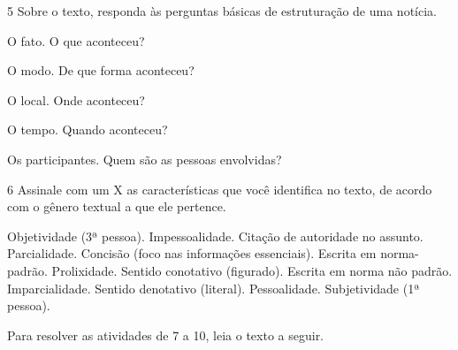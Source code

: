 \num{5} Sobre o texto, responda às perguntas básicas de estruturação de uma notícia.

\begin{escolha}
\item O fato. O que aconteceu? 


\item O modo. De que forma aconteceu? 


\item O local. Onde aconteceu? 


\item O tempo. Quando aconteceu? 


\item Os participantes. Quem são as pessoas envolvidas? 

\end{escolha}



\num{6} Assinale com um X as características que você identifica no
texto, de acordo com o gênero textual a que ele pertence.

\begin{boxlist}
 Objetividade (3ª pessoa). 
 Impessoalidade.
 Citação de autoridade no assunto. 
 Parcialidade. 
 Concisão (foco nas informações essenciais). 
 Escrita em norma-padrão. 
 Prolixidade.
 Sentido conotativo (figurado).
 Escrita em norma não padrão. 
 Imparcialidade.
 Sentido denotativo (literal).
 Pessoalidade.
 Subjetividade (1ª pessoa).
\end{boxlist}

\pagebreak

Para resolver as atividades de 7 a 10, leia o texto a seguir.

